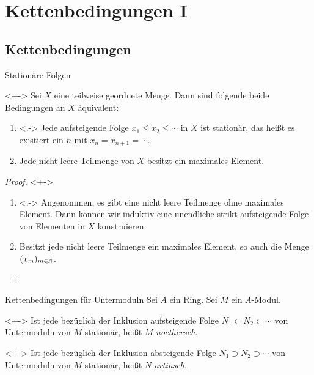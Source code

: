 \section{Kettenbedingungen I}

\subsection{Kettenbedingungen}

\begin{frame}{Stationäre Folgen}
	\begin{proposition}<+->
		Sei \(X\) eine teilweise geordnete Menge. Dann sind folgende beide
		Bedingungen an \(X\) äquivalent:
		\begin{enumerate}[<+->]
		\item<.->
			Jede aufsteigende Folge \(x_1 \le x_2 \le \dotsb\) in \(X\) 
			ist stationär, das heißt es existiert ein \(n\) mit
			\(x_n = x_{n + 1} = \dotsb\).
		\item
			Jede nicht leere Teilmenge von \(X\) besitzt ein maximales Element.
		\end{enumerate}
	\end{proposition}
	\begin{proof}<+->
		\begin{enumerate}[<+->]
		\item<.->
			Angenommen, es gibt eine nicht leere Teilmenge ohne maximales
			Element. Dann können wir induktiv eine unendliche strikt
			aufsteigende Folge von Elementen in \(X\) konstruieren.
		\item
			Besitzt jede nicht leere Teilmenge ein maximales Element, so
			auch die Menge \((x_m)_{m \in \mathbb N}\).
			\qedhere
		\end{enumerate}
	\end{proof}
\end{frame}

\begin{frame}{Kettenbedingungen für Untermoduln}
	Sei \(A\) ein Ring. Sei \(M\) ein \(A\)-Modul.
	\begin{definition}<+->
		Ist jede bezüglich der Inklusion aufsteigende Folge
		\(N_1 \subset N_2 \subset \dotsb\)
		von Untermoduln von \(M\) stationär, heißt \(M\) \emph{noethersch}.
	\end{definition}
	\begin{definition}<+->
		Ist jede bezüglich der Inklusion absteigende Folge
		\(N_1 \supset N_2 \supset \dotsb\) von Untermoduln von \(M\)
		stationär, heißt \(N\) \emph{artinsch}.
	\end{definition}
\end{frame}

